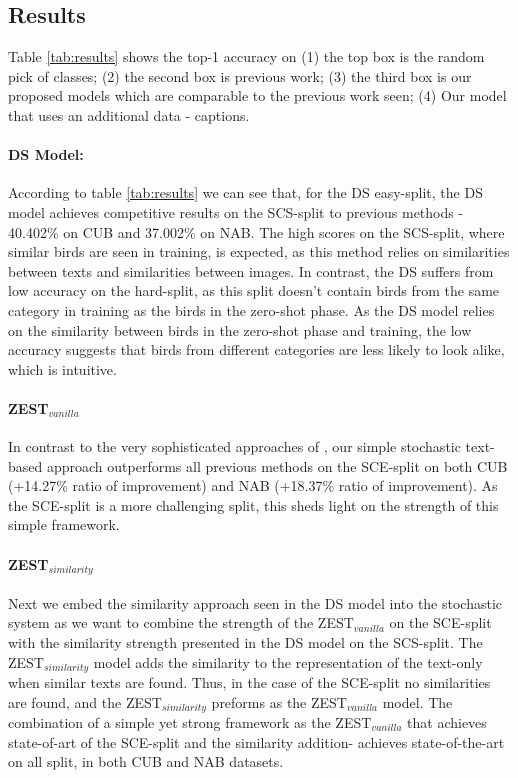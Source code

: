 \documentclass[11pt,a4paper]{article}
\begin{document}
\subsection{Results}

Table \ref{tab:results} shows the top-1 accuracy
on (1) the top box is the random pick of classes; (2) the second box is previous work; (3) the third box is our proposed models which are comparable to the previous work seen; (4) Our model that uses an additional data - captions. \par 

\paragraph{DS Model:} 
According to table \ref{tab:results} we can see that, for the DS easy-split, the DS model achieves competitive results on the SCS-split to previous methods - 40.402\% on CUB and 37.002\% on NAB. The high scores on the SCS-split, where similar birds are seen in training, is expected, as this method relies on similarities between texts and similarities between images.
In contrast, the DS suffers from low accuracy on the hard-split, as this split doesn't contain birds from the same category in training as the birds in the zero-shot phase. As the DS model relies on the similarity between birds in the zero-shot phase and training, the low accuracy suggests that birds from different categories are less likely to look alike, which is intuitive. 

\paragraph{ZEST$_{vanilla}$}
In contrast to the very sophisticated approaches of \citet{zhu2018generative}, our simple stochastic text-based approach outperforms all previous methods on the SCE-split on both CUB (+14.27\% ratio of improvement) and NAB (+18.37\%  ratio of improvement). As the SCE-split is a more challenging split, this sheds light on the strength of this simple framework.  

\paragraph{ZEST$_{similarity}$}
Next we embed the similarity approach seen in the DS model into the stochastic system as we want to combine the strength of the ZEST$_{vanilla}$ on the SCE-split with the similarity strength presented in the DS model on the SCS-split.
The ZEST$_{similarity}$ model adds the similarity to the representation of the text-only when similar texts are found. Thus, in the case of the SCE-split no similarities are found, and the ZEST$_{similarity}$ preforms as the ZEST$_{vanilla}$ model. 
The combination of a simple yet strong framework as the ZEST$_{vanilla}$ that achieves state-of-art of the SCE-split and the similarity addition- achieves state-of-the-art on all split, in both CUB and NAB datasets. \par
\end{document}
